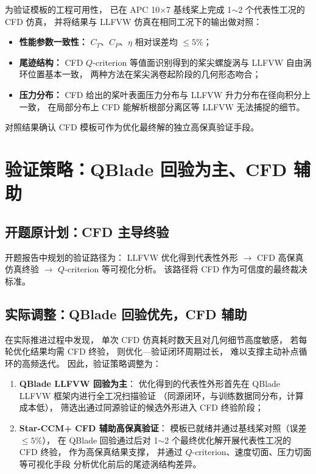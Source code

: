 为验证模板的工程可用性，
已在 APC 10$\times$7 基线桨上完成 1$\sim$2 个代表性工况的 CFD 仿真，
并将结果与 LLFVW 仿真在相同工况下的输出做对照：

\begin{itemize}
  \item \textbf{性能参数一致性：}
        $C_T$、$C_P$、$\eta$ 相对误差均 $\leq 5\%$；
  \item \textbf{尾迹结构：}
        CFD $Q$-criterion 等值面识别得到的桨尖螺旋涡与 LLFVW 自由涡环位置基本一致，
        两种方法在桨尖涡卷起阶段的几何形态吻合；
  \item \textbf{压力分布：}
        CFD 给出的桨叶表面压力分布与 LLFVW 升力分布在径向积分上一致，
        在局部分布上 CFD 能解析根部分离区等 LLFVW 无法捕捉的细节。
\end{itemize}

对照结果确认 CFD 模板可作为优化最终解的独立高保真验证手段。

\section{验证策略：QBlade 回验为主、CFD 辅助}

\subsection{开题原计划：CFD 主导终验}

开题报告中规划的验证路径为：
LLFVW 优化得到代表性外形 $\rightarrow$
CFD 高保真仿真终验 $\rightarrow$
$Q$-criterion 等可视化分析。
该路径将 CFD 作为可信度的最终裁决标准。

\subsection{实际调整：QBlade 回验优先，CFD 辅助}

在实际推进过程中发现，
单次 CFD 仿真耗时数天且对几何细节高度敏感，
若每轮优化结果均需 CFD 终验，
则优化—验证闭环周期过长，
难以支撑主动补点循环的高频迭代。
因此，验证策略调整为：

\begin{enumerate}
  \item \textbf{QBlade LLFVW 回验为主}：
        优化得到的代表性外形首先在 QBlade LLFVW 框架内进行全工况扫描验证
        （同源闭环，与训练数据同分布，计算成本低），
        筛选出通过同源验证的候选外形进入 CFD 终验阶段；
  \item \textbf{Star-CCM+ CFD 辅助高保真验证}：
        模板已就绪并通过基线桨对照（误差 $\leq 5\%$），
        在 QBlade 回验通过后对 1$\sim$2 个最终优化解开展代表性工况的 CFD 终验，
        作为高保真结果支撑，
        并通过 $Q$-criterion、速度切面、压力切面等可视化手段
        分析优化前后的尾迹涡结构差异。
\end{enumerate}

